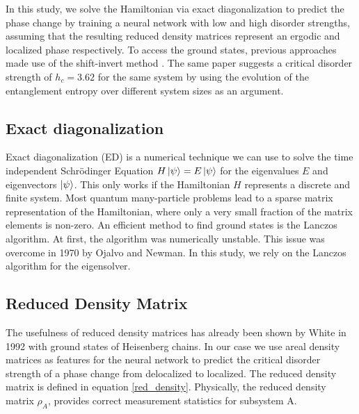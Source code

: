 \documentclass[reprint,amsmath,amssymb,aps,prb]{revtex4-2}
\begin{document}
In this study, we solve the Hamiltonian via exact diagonalization to predict the phase change by training a neural network with low and high disorder strengths, assuming that the resulting reduced density matrices represent an ergodic and localized phase respectively. To access the ground states, previous approaches made use of the shift-invert method \cite{Luitz2015}. The same paper suggests a critical disorder strength of $h_c=3.62$ for the same system by using the evolution of the entanglement entropy over different system sizes as an argument.



\subsection{Exact diagonalization}

Exact diagonalization (ED) is a numerical technique we can use to solve the time independent Schrödinger Equation $H\ket{\psi}=E\ket{\psi}$ for the eigenvalues $E$ and eigenvectors $\ket{\psi}$. This only works if the Hamiltonian $H$ represents a discrete and finite system. Most quantum many-particle problems lead to a sparse matrix representation of the Hamiltonian, where only a very small fraction of the matrix
elements is non-zero.\cite{Weisse2008} An efficient method to find ground states is the Lanczos algorithm.\cite{Lanczos1950} At first, the algorithm was numerically unstable. This issue was overcome in 1970 by Ojalvo and Newman.\cite{Ojalvo1970} In this study, we rely on the Lanczos algorithm for the eigensolver.

\subsection{Reduced Density Matrix}

The usefulness of reduced density matrices has already been shown by White in 1992 with ground states of Heisenberg chains.\cite{White1992} In our case we use areal density matrices as features for the neural network to predict the critical disorder strength of a phase change from delocalized to localized. The reduced density matrix is defined in equation \ref{red_density}. Physically, the reduced density matrix $\rho_A$, provides correct measurement statistics for subsystem A.
\end{document}
